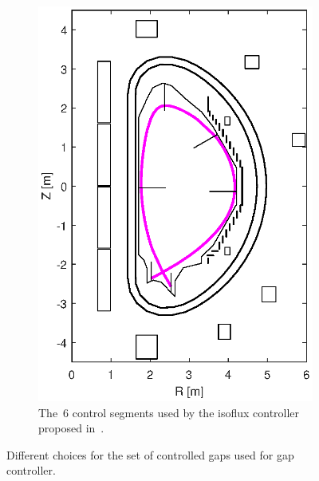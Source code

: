 \begin{figure}
\begin{subfigure}[b]{0.32\textwidth}
		\includegraphics[width=\textwidth]{Chp3/6_gaps.eps} 
		\caption{ The~6 control segments used by the isoflux controller proposed in~\cite{Miyata:2014}. \label{figure:6_gaps}}
	\end{subfigure}
	
\caption{Different choices for the set of controlled gaps used for gap controller.} \label{figure:gapChoices}
\end{figure}




